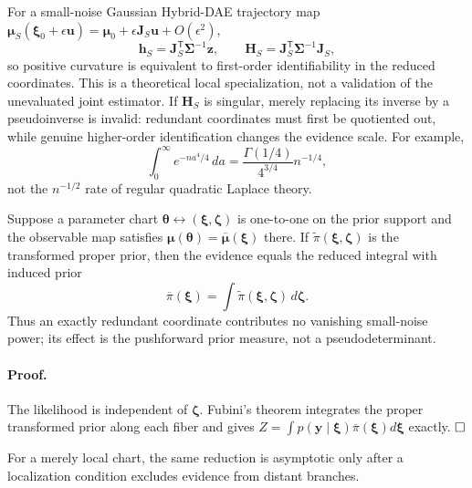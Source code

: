 For a small-noise Gaussian Hybrid-DAE trajectory map
$\bm\mu_S(\bm\xi_0+\epsilon\bm u)
=\bm\mu_0+\epsilon\bm J_S\bm u+O(\epsilon^2)$,
\begin{equation}
 \bm h_S=\bm J_S^{\mathsf T}\bm\Sigma^{-1}\bm z,\qquad
 \bm H_S=\bm J_S^{\mathsf T}\bm\Sigma^{-1}\bm J_S,
 \label{eq:supp-dae-cone-laplace-hessian}
\end{equation}
so positive curvature is equivalent to first-order identifiability in the
reduced coordinates. This is a theoretical local specialization, not a
validation of the unevaluated joint estimator. If $\bm H_S$ is singular, merely
replacing its inverse by a pseudoinverse is invalid: redundant coordinates must
first be quotiented out, while genuine higher-order identification changes the
evidence scale. For example,
\begin{equation}
 \int_0^\infty e^{-na^4/4}\,da
 =\frac{\Gamma(1/4)}{4^{3/4}}n^{-1/4},
 \label{eq:supp-singular-quartic-evidence}
\end{equation}
not the $n^{-1/2}$ rate of regular quadratic Laplace theory.

\begin{proposition}
Suppose a parameter chart $\bm\theta\leftrightarrow(\bm\xi,\bm\zeta)$ is
one-to-one on the prior support and the observable map satisfies
$\bm\mu(\bm\theta)=\overline{\bm\mu}(\bm\xi)$ there. If
$\widetilde\pi(\bm\xi,\bm\zeta)$ is the transformed proper prior, then the
evidence equals the reduced integral with induced prior
\begin{equation}
 \overline\pi(\bm\xi)=
 \int\widetilde\pi(\bm\xi,\bm\zeta)\,d\bm\zeta.
 \label{eq:supp-induced-fiber-prior}
\end{equation}
Thus an exactly redundant coordinate contributes no vanishing small-noise
power; its effect is the pushforward prior measure, not a pseudodeterminant.
\label{prop:supp-redundant-fiber}
\end{proposition}

\paragraph{Proof.}
The likelihood is independent of $\bm\zeta$. Fubini's theorem integrates the
proper transformed prior along each fiber and gives
$Z=\int p(\bm y\mid\bm\xi)\overline\pi(\bm\xi)d\bm\xi$ exactly.
$\hfill\square$

For a merely local chart, the same reduction is asymptotic only after a
localization condition excludes evidence from distant branches.

